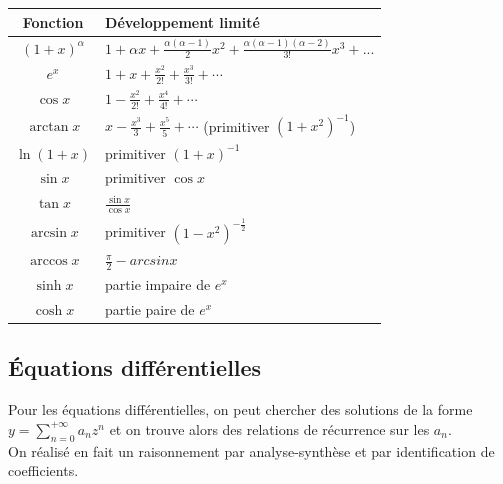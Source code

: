 \documentclass{article}
\begin{document}
\begin{center}
\begin{tabular}{|c|l|}
\hline
\textbf{Fonction} & \textbf{Développement limité} \\
\hline
$(1+x)^\alpha$ & $1 + \alpha x + \frac{\alpha(\alpha-1)}{2} x^2 + \frac{\alpha(\alpha-1)(\alpha-2)}{3!} x^3 + ...$ \\
\hline
$e^x$ & $1 + x + \frac{x^2}{2!} + \frac{x^3}{3!} + \cdots$ \\
\hline
$\cos x$ & $1 - \frac{x^2}{2!} + \frac{x^4}{4!} + \cdots$ \\
\hline
$\arctan x$ & $x - \frac{x^3}{3} + \frac{x^5}{5} + \cdots$ (primitiver $(1+x^2)^{-1}$) \\

\hline
$\ln(1+x)$ & primitiver $(1+x)^{-1}$\\
\hline
$\sin x$ & primitiver $\cos x$ \\
\hline
$\tan x$ & $\frac{\sin x}{\cos x}$ \\
\hline
$\arcsin x$ & primitiver $(1-x^2)^{-\frac{1}{2}}$ \\
\hline
$\arccos x$ & $\frac{\pi}{2} - arcsin x$ \\
\hline
$\sinh x$ & partie impaire de $e^x$ \\
\hline
$\cosh x$ & partie paire de $e^x$ \\
\hline
\end{tabular}
\end{center}

\subsection{Équations différentielles}

Pour les équations différentielles, on peut chercher des solutions de la forme $y = \sum_{n=0}^{+\infty} a_n z^n$ et on trouve alors des relations de récurrence sur les $a_n$.\\
On réalisé en fait un raisonnement par analyse-synthèse et par identification de coefficients.\\


\newpage
\tableofcontents
\end{document}
